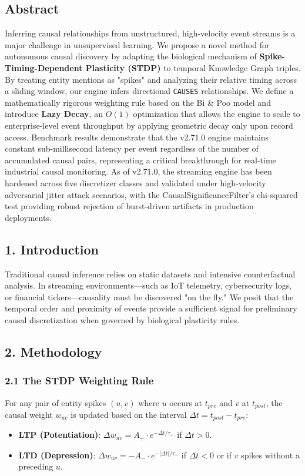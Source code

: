 
\subsection*{Abstract}
Inferring causal relationships from unstructured, high-velocity event streams is a major challenge in unsupervised learning. We propose a novel method for autonomous causal discovery by adapting the biological mechanism of \textbf{Spike-Timing-Dependent Plasticity (STDP)} to temporal Knowledge Graph triples. By treating entity mentions as "spikes" and analyzing their relative timing across a sliding window, our engine infers directional \texttt{CAUSES} relationships. We define a mathematically rigorous weighting rule based on the Bi \& Poo \cite{bipoo1998} model and introduce \textbf{Lazy Decay}, an $O(1)$ optimization that allows the engine to scale to enterprise-level event throughput by applying geometric decay only upon record access. Benchmark results demonstrate that the v2.71.0 engine maintains constant sub-millisecond latency per event regardless of the number of accumulated causal pairs, representing a critical breakthrough for real-time industrial causal monitoring. As of v2.71.0, the streaming engine has been hardened across five discretizer classes and validated under high-velocity adversarial jitter attack scenarios, with the CausalSignificanceFilter's chi-squared test providing robust rejection of burst-driven artifacts in production deployments.

\subsection*{1. Introduction}
Traditional causal inference relies on static datasets and intensive counterfactual analysis. In streaming environments---such as IoT telemetry, cybersecurity logs, or financial tickers---causality must be discovered "on the fly." We posit that the temporal order and proximity of events provide a sufficient signal for preliminary causal discretization when governed by biological plasticity rules.

\subsection*{2. Methodology}

\subsubsection*{2.1 The STDP Weighting Rule}
For any pair of entity spikes $(u, v)$ where $u$ occurs at $t_{pre}$ and $v$ at $t_{post}$, the causal weight $w_{uv}$ is updated based on the interval $\Delta t = t_{post} - t_{pre}$:
\begin{itemize}
  \item \textbf{LTP (Potentiation)}: $\Delta w_{uv} = A_+ \cdot e^{-\Delta t / \tau_+}$ if $\Delta t > 0$.
  \item \textbf{LTD (Depression)}: $\Delta w_{uv} = -A_- \cdot e^{-|\Delta t| / \tau_-}$ if $\Delta t < 0$ or if $v$ spikes without a preceding $u$.
\end{itemize}


